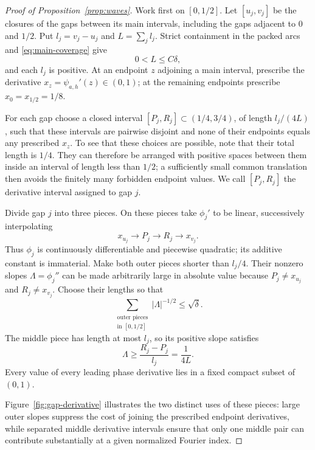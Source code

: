 \begin{proof}[Proof of Proposition~\ref{prop:waves}]
Work first on $[0,1/2]$.  Let $[u_j,v_j]$ be the closures of the gaps
between its main intervals, including the gaps adjacent to $0$ and
$1/2$.  Put $l_j=v_j-u_j$ and $L=\sum_jl_j$.  Strict containment in the
packed arcs and \eqref{eq:main-coverage} give
\[
 0<L\le C\delta,
\]
and each $l_j$ is positive.  At an endpoint $z$ adjoining a main interval,
prescribe the derivative $x_z=\psi_{a,h}'(z)\in(0,1)$; at the remaining
endpoints prescribe $x_0=x_{1/2}=1/8$.

For each gap choose a closed interval $[P_j,R_j]\subset(1/4,3/4)$, of
length $l_j/(4L)$, such that these intervals are pairwise disjoint and
none of their endpoints equals any prescribed $x_z$.  To see that these
choices are possible, note that their total length is $1/4$.  They can
therefore be arranged with positive spaces between them inside an interval
of length less than $1/2$; a sufficiently small common translation then
avoids the finitely many forbidden endpoint values.  We call
$[P_j,R_j]$ the derivative interval assigned to gap $j$.

Divide gap $j$ into three pieces.  On these pieces take $\phi_j'$ to be
linear, successively interpolating
\begin{equation}\label{eq:gap-derivative-path}
 x_{u_j}\longrightarrow P_j\longrightarrow R_j\longrightarrow x_{v_j}.
\end{equation}
Thus $\phi_j$ is continuously differentiable and piecewise quadratic;
its additive constant is immaterial.  Make both outer pieces shorter
than $l_j/4$.  Their nonzero slopes $\Lambda=\phi_j''$ can be made
arbitrarily large in absolute value because $P_j\ne x_{u_j}$ and
$R_j\ne x_{v_j}$.  Choose their lengths so that
\begin{equation}\label{eq:gap-outer-slopes}
 \sum_{\substack{\text{outer pieces}\\\text{in }[0,1/2]}}
       |\Lambda|^{-1/2}\le\sqrt\delta.
\end{equation}
The middle piece has length at most $l_j$, so its positive slope satisfies
\begin{equation}\label{eq:gap-middle-slope}
 \Lambda\ge\frac{R_j-P_j}{l_j}=\frac1{4L}.
\end{equation}
Every value of every leading phase derivative lies in a fixed compact
subset of $(0,1)$.

Figure~\ref{fig:gap-derivative} illustrates the two distinct uses of these
pieces: large outer slopes suppress the cost of joining the prescribed
endpoint derivatives, while separated middle derivative intervals ensure
that only one middle pair can contribute substantially at a given
normalized Fourier index.


\end{proof}
